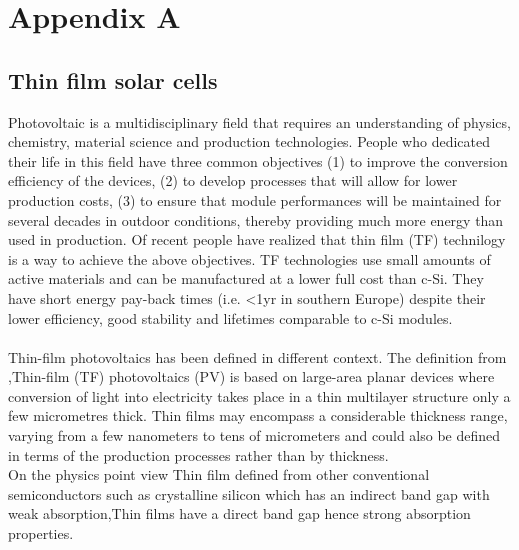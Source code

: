 \chapter{Appendix A}
\label{app:app01}
\section{Thin film solar cells}
Photovoltaic is a multidisciplinary field that requires an understanding of physics, chemistry, material science and production technologies. People who dedicated their life in this field have three common objectives (1) to improve the conversion efficiency of the devices, (2) to develop processes that will allow for lower production costs, (3) to ensure that module performances will be maintained for several decades in outdoor conditions, thereby providing much more energy than used in production. Of recent people have realized that thin  film (TF) technilogy is a way to achieve the above objectives. TF technologies use small amounts of active materials and can be manufactured at a lower full cost than c-Si. They have short energy pay-back times (i.e. <1yr in southern Europe) despite their lower efficiency, good stability and lifetimes comparable to c-Si modules. 
\\
\\Thin-film photovoltaics has been defined in different context.%
The definition from \cite{Martevs},Thin-film (TF) photovoltaics (PV) is based on large-area planar devices where conversion of light into electricity takes place in a thin multilayer structure only a few micrometres thick. Thin films may encompass a considerable thickness range, varying from a few nanometers to tens of micrometers and could also be  defined in terms of the production processes rather than by thickness.\\
On the physics point view Thin film defined from other conventional semiconductors such as crystalline silicon which has an indirect band gap with weak absorption,Thin films have a direct band gap hence strong absorption properties. 
